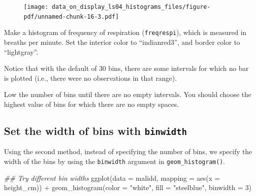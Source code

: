 \documentclass[
  letterpaper,
  DIV=11,
  numbers=noendperiod]{scrreprt}
\newenvironment{Shaded}{\begin{snugshade}}{\end{snugshade}}
\newcommand{\AttributeTok}[1]{\textcolor[rgb]{0.40,0.45,0.13}{#1}}
\newcommand{\DecValTok}[1]{\textcolor[rgb]{0.68,0.00,0.00}{#1}}
\newcommand{\DocumentationTok}[1]{\textcolor[rgb]{0.37,0.37,0.37}{\textit{#1}}}
\newcommand{\FunctionTok}[1]{\textcolor[rgb]{0.28,0.35,0.67}{#1}}
\newcommand{\NormalTok}[1]{\textcolor[rgb]{0.00,0.23,0.31}{#1}}
\newcommand{\SpecialCharTok}[1]{\textcolor[rgb]{0.37,0.37,0.37}{#1}}
\newcommand{\StringTok}[1]{\textcolor[rgb]{0.13,0.47,0.30}{#1}}
\begin{document}
\begin{figure}[H]

{\centering \texttt{[image: data\_on\_display\_ls04\_histograms\_files/figure-pdf/unnamed-chunk-16-3.pdf]}

}

\end{figure}

\begin{tcolorbox}[enhanced jigsaw, colframe=quarto-callout-tip-color-frame, rightrule=.15mm, opacityback=0, breakable, coltitle=black, colbacktitle=quarto-callout-tip-color!10!white, bottomrule=.15mm, leftrule=.75mm, toprule=.15mm, arc=.35mm, bottomtitle=1mm, colback=white, left=2mm, opacitybacktitle=0.6, titlerule=0mm, title=\textcolor{quarto-callout-tip-color}{\faLightbulb}\hspace{0.5em}{Practice}, toptitle=1mm]

Make a histogram of frequency of respiration (\texttt{freqrespi}), which
is measured in breaths per minute. Set the interior color to
``indianred3'', and border color to ``lightgray''.

Notice that with the default of 30 bins, there are some intervals for
which no bar is plotted (i.e., there were no observations in that
range).

Low the number of bins until there are no empty intervals. You should
choose the highest value of bins for which there are no empty spaces.

\end{tcolorbox}

\hypertarget{set-the-width-of-bins-with-binwidth}{%
\subsection{\texorpdfstring{Set the width of bins with
\texttt{binwidth}}{Set the width of bins with binwidth}}\label{set-the-width-of-bins-with-binwidth}}

Using the second method, instead of specifying the number of bins, we
specify the width of the bins by using the \texttt{binwidth} argument in
\texttt{geom\_histogram()}.

\begin{Shaded}
\begin{Highlighting}[]
\DocumentationTok{\#\# Try different bin widths}
\FunctionTok{ggplot}\NormalTok{(}\AttributeTok{data =}\NormalTok{  malidd, }
       \AttributeTok{mapping =} \FunctionTok{aes}\NormalTok{(}\AttributeTok{x =}\NormalTok{ height\_cm)) }\SpecialCharTok{+}
  \FunctionTok{geom\_histogram}\NormalTok{(}\AttributeTok{color =} \StringTok{"white"}\NormalTok{, }
                 \AttributeTok{fill =} \StringTok{"steelblue"}\NormalTok{,}
                 \AttributeTok{binwidth =} \DecValTok{3}\NormalTok{)}
\end{Highlighting}
\end{Shaded}
\end{document}
